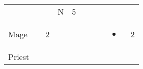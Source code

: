 \documentclass[12pt]{article}
\begin{document}
\begin{longtable}[]{@{}llllllllll@{}}
\begin{minipage}[t]{0.06\columnwidth}
\strut\end{minipage} &
\begin{minipage}[t]{0.06\columnwidth}\raggedright\strut
\strut\end{minipage} &
\begin{minipage}[t]{0.06\columnwidth}\raggedright\strut
\strut\end{minipage} &
\begin{minipage}[t]{0.07\columnwidth}\raggedright\strut
N
\strut\end{minipage} &
\begin{minipage}[t]{0.08\columnwidth}\raggedright\strut
5
\strut\end{minipage}\tabularnewline
\begin{minipage}[t]{0.13\columnwidth}\raggedright\strut
Mage
\strut\end{minipage} &
\begin{minipage}[t]{0.06\columnwidth}\raggedright\strut
\strut\end{minipage} &
\begin{minipage}[t]{0.06\columnwidth}\raggedright\strut
2
\strut\end{minipage} &
\begin{minipage}[t]{0.06\columnwidth}\raggedright\strut
\strut\end{minipage} &
\begin{minipage}[t]{0.06\columnwidth}\raggedright\strut
\strut\end{minipage} &
\begin{minipage}[t]{0.06\columnwidth}\raggedright\strut
\strut\end{minipage} &
\begin{minipage}[t]{0.06\columnwidth}\raggedright\strut
\strut\end{minipage} &
\begin{minipage}[t]{0.06\columnwidth}\raggedright\strut
\strut\end{minipage} &
\begin{minipage}[t]{0.07\columnwidth}\raggedright\strut
\begin{itemize}
\item
\end{itemize}
\strut\end{minipage} &
\begin{minipage}[t]{0.08\columnwidth}\raggedright\strut
2
\strut\end{minipage}\tabularnewline
\begin{minipage}[t]{0.13\columnwidth}\raggedright\strut
Priest
\strut\end{minipage} &

\end{longtable}
\end{document}

